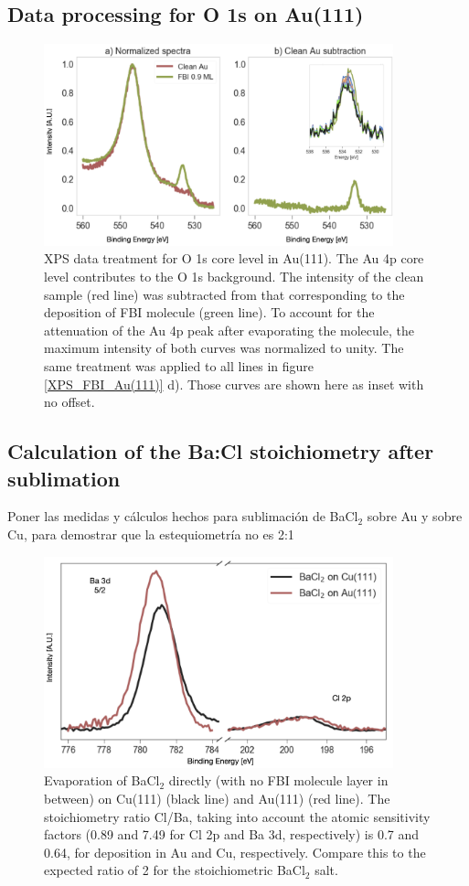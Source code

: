 \documentclass[aps,prl,reprint,longbibliography,superscriptaddress]{revtex4-1}
\def\BaCl{BaCl$_2$ }
\newcommand{\completar}[1]{{\color{red} #1}}
\begin{document}
\subsection{Data processing for O 1s on Au(111)}
\begin{figure}[ht!]
	\includegraphics[width=0.9\textwidth]{figures/si_au_subtraction.png}
	\caption{\label{Au_subtraction} 
    XPS data treatment for O 1s core level in Au(111). The Au 4p core level contributes to the O 1s background. The intensity of the clean sample (red line) was subtracted from that corresponding to the deposition of FBI molecule (green line). To account for the attenuation of the Au 4p peak after evaporating the molecule, the maximum intensity of both curves was normalized to unity. The same treatment was applied to all lines in figure \ref{XPS_FBI_Au(111)} d). Those curves are shown here as inset with no offset.}
\end{figure}  

\subsection{Calculation of the Ba:Cl stoichiometry after sublimation}
\completar{Poner las medidas y cálculos hechos para sublimación de \BaCl sobre Au y sobre Cu, para demostrar que la estequiometría no es 2:1}
\begin{figure}[ht!]
	\includegraphics[width=0.9\textwidth]{figures/si_bacl_au_cu.png}
	\caption{\label{Chlorine_desorption} 
    Evaporation of \BaCl directly (with no FBI molecule layer in between) on Cu(111) (black line) and Au(111) (red line). The stoichiometry ratio Cl/Ba, taking into account the atomic sensitivity factors (0.89 and 7.49 for Cl 2p and Ba 3d, respectively) is 0.7 and 0.64, for deposition in Au and Cu, respectively. Compare this to the expected ratio of 2 for the stoichiometric \BaCl salt.}
\end{figure}  
\end{document}

